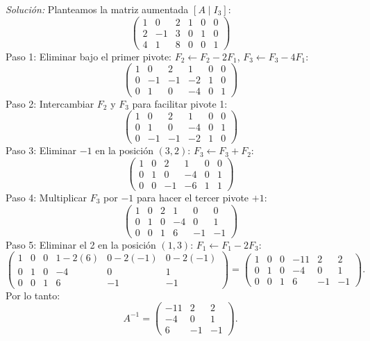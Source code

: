 \documentclass[11pt,letterpaper]{article}
\theoremstyle{definition}
\theoremstyle{plain}
\begin{document}
\emph{Solución:}
Planteamos la matriz aumentada $[A \mid I_3]$:
\[
\left(\begin{array}{ccc|ccc}
1 & 0 & 2 & 1 & 0 & 0 \\
2 & -1 & 3 & 0 & 1 & 0 \\
4 & 1 & 8 & 0 & 0 & 1
\end{array}\right)
\]
Paso 1: Eliminar bajo el primer pivote: $F_2 \leftarrow F_2 - 2F_1$, $F_3 \leftarrow F_3 - 4F_1$:
\[
\left(\begin{array}{ccc|ccc}
1 & 0 & 2 & 1 & 0 & 0 \\
0 & -1 & -1 & -2 & 1 & 0 \\
0 & 1 & 0 & -4 & 0 & 1
\end{array}\right)
\]
Paso 2: Intercambiar $F_2$ y $F_3$ para facilitar pivote 1:
\[
\left(\begin{array}{ccc|ccc}
1 & 0 & 2 & 1 & 0 & 0 \\
0 & 1 & 0 & -4 & 0 & 1 \\
0 & -1 & -1 & -2 & 1 & 0
\end{array}\right)
\]
Paso 3: Eliminar $-1$ en la posición $(3,2)$: $F_3 \leftarrow F_3 + F_2$:
\[
\left(\begin{array}{ccc|ccc}
1 & 0 & 2 & 1 & 0 & 0 \\
0 & 1 & 0 & -4 & 0 & 1 \\
0 & 0 & -1 & -6 & 1 & 1
\end{array}\right)
\]
Paso 4: Multiplicar $F_3$ por $-1$ para hacer el tercer pivote $+1$:
\[
\left(\begin{array}{ccc|ccc}
1 & 0 & 2 & 1 & 0 & 0 \\
0 & 1 & 0 & -4 & 0 & 1 \\
0 & 0 & 1 & 6 & -1 & -1
\end{array}\right)
\]
Paso 5: Eliminar el 2 en la posición $(1,3)$: $F_1 \leftarrow F_1 - 2F_3$:
\[
\left(\begin{array}{ccc|ccc}
1 & 0 & 0 & 1 - 2(6) & 0 - 2(-1) & 0 - 2(-1) \\
0 & 1 & 0 & -4 & 0 & 1 \\
0 & 0 & 1 & 6 & -1 & -1
\end{array}\right) = 
\left(\begin{array}{ccc|ccc}
1 & 0 & 0 & -11 & 2 & 2 \\
0 & 1 & 0 & -4 & 0 & 1 \\
0 & 0 & 1 & 6 & -1 & -1
\end{array}\right).
\]
Por lo tanto:
\[
A^{-1} = \begin{pmatrix} -11 & 2 & 2 \\ -4 & 0 & 1 \\ 6 & -1 & -1 \end{pmatrix}.
\]
\end{document}
